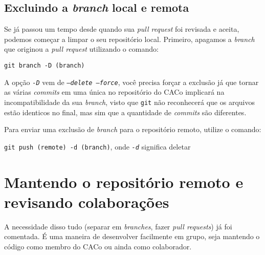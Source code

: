 \documentclass[a4paper,oneside,10pt]{memoir}
\begin{document}
\section{Excluindo a \emph{branch} local e remota}

Se já passou um tempo desde quando sua \emph{pull request} foi revisada e
aceita, podemos começar a limpar o seu repositório local. Primeiro, apagamos a
\emph{branch} que originou a \emph{pull request} utilizando o comando:

\begin{center}
\texttt{git branch -D (branch)}
\end{center}

A opção \emph{\texttt{-D}} vem de \emph{\texttt{--delete --force}}, você
precisa forçar a exclusão já que tornar as várias \emph{commits} em uma única
no repositório do CACo implicará na incompatibilidade da sua \emph{branch},
visto que \texttt{git} não reconhecerá que os arquivos estão identicos no
final, mas sim que a quantidade de \emph{commits} são diferentes.

Para enviar uma exclusão de \emph{branch} para o repositório remoto, utilize o
comando:

\begin{center}
\texttt{git push (remote) -d (branch)}, onde \emph{\texttt{-d}} significa
deletar
\end{center}


\chapter{Mantendo o repositório remoto e revisando colaborações}

A necessidade disso tudo (separar em \emph{branches}, fazer \emph{pull
requests}) já foi comentada. É uma maneira de desenvolver facilmente em grupo,
seja mantendo o código como membro do CACo ou ainda como colaborador.
\end{document}
